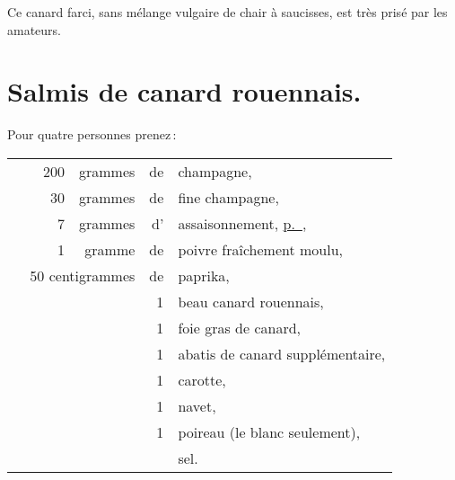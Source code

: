 Ce canard farci, sans mélange vulgaire de chair à saucisses, est très prisé par
les amateurs.

\section*{\centering Salmis de canard rouennais.}
{}

Pour quatre personnes prenez :

\footnotesize
\begin{longtable}{rrrrrp{18em}}
  & \hspace{2em} & 200 & grammes & de & champagne,                                                        \\
  & \hspace{2em} &  30 & grammes & de & fine champagne,                                                   \\
  & \hspace{2em} &   7 & grammes & d' & assaisonnement, \hyperlink{p0585}{p. \pageref{pg0585}},           \\
  & \hspace{2em} &   1 & gramme  & de & poivre fraîchement moulu,                                         \\
  & \multicolumn{3}{r}{50 centigrammes} & de & paprika,                                                   \\
  & \hspace{2em} &     &         &  1 & beau canard rouennais,                                            \\
  & \hspace{2em} &     &         &  1 & foie gras de canard,                                              \\
  & \hspace{2em} &     &         &  1 & abatis de canard supplémentaire,                                  \\
  & \hspace{2em} &     &         &  1 & carotte,                                                          \\
  & \hspace{2em} &     &         &  1 & navet,                                                            \\
  & \hspace{2em} &     &         &  1 & poireau (le blanc seulement),                                     \\
  & \hspace{2em} &     &         &    & sel.                                                              \\
\end{longtable}
\normalsize

